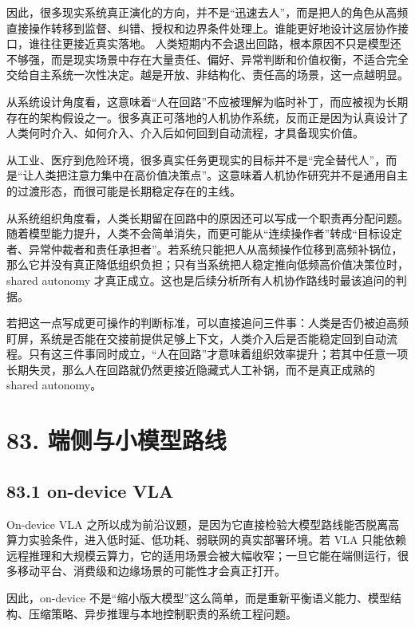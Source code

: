 因此，很多现实系统真正演化的方向，并不是“迅速去人”，而是把人的角色从高频直接操作转移到监督、纠错、授权和边界条件处理上。谁能更好地设计这层协作接口，谁往往更接近真实落地。 人类短期内不会退出回路，根本原因不只是模型还不够强，而是现实场景中存在大量责任、偏好、异常判断和价值权衡，不适合完全交给自主系统一次性决定。越是开放、非结构化、责任高的场景，这一点越明显。

从系统设计角度看，这意味着“人在回路”不应被理解为临时补丁，而应被视为长期存在的架构假设之一。很多真正可落地的人机协作系统，反而正是因为认真设计了人类何时介入、如何介入、介入后如何回到自动流程，才具备现实价值。

从工业、医疗到危险环境，很多真实任务更现实的目标并不是“完全替代人”，而是“让人类把注意力集中在高价值决策点”。这意味着人机协作研究并不是通用自主的过渡形态，而很可能是长期稳定存在的主线。

从系统组织角度看，人类长期留在回路中的原因还可以写成一个职责再分配问题。随着模型能力提升，人类不会简单消失，而更可能从“连续操作者”转成“目标设定者、异常仲裁者和责任承担者”。若系统只能把人从高频操作位移到高频补锅位，那么它并没有真正降低组织负担；只有当系统把人稳定推向低频高价值决策位时，shared autonomy 才真正成立。这也是后续分析所有人机协作路线时最该追问的判据。

若把这一点写成更可操作的判断标准，可以直接追问三件事：人类是否仍被迫高频盯屏，系统是否能在交接前提供足够上下文，人类介入后是否能稳定回到自动流程。只有这三件事同时成立，“人在回路”才意味着组织效率提升；若其中任意一项长期失灵，那么人在回路就仍然更接近隐藏式人工补锅，而不是真正成熟的 shared autonomy。

\section*{83. 端侧与小模型路线}

\subsection*{83.1 on-device VLA}


On-device VLA 之所以成为前沿议题，是因为它直接检验大模型路线能否脱离高算力实验条件，进入低时延、低功耗、弱联网的真实部署环境。若 VLA 只能依赖远程推理和大规模云算力，它的适用场景会被大幅收窄；一旦它能在端侧运行，很多移动平台、消费级和边缘场景的可能性才会真正打开。

因此，on-device 不是“缩小版大模型”这么简单，而是重新平衡语义能力、模型结构、压缩策略、异步推理与本地控制职责的系统工程问题。

